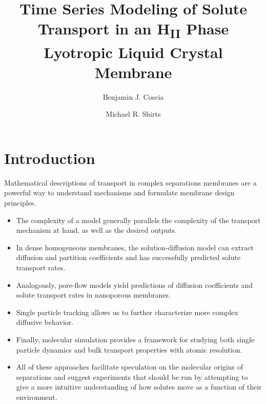 \documentclass{article}
\title{Time Series Modeling of Solute Transport in an H\textsubscript{II} Phase Lyotropic Liquid Crystal Membrane}
\author{Benjamin J. Coscia \and Michael R. Shirts}
\begin{document}
  \graphicspath{{./figures/}}
  \maketitle

  \section{Introduction}

  Mathematical descriptions of transport in complex separations membranes are a powerful 
  way to understand mechanisms and formulate membrane design principles.
  \begin{itemize}
    \item The complexity of a model generally parallels the complexity of the 
    transport mechanism at hand, as well as the desired outputs.
    \item In dense homogeneous membranes, the solution-diffusion model can extract
    diffusion and partition coefficients and has successfully predicted solute transport
    rates.
    \item Analogously, pore-flow models yield predictions of diffusion coefficients
    and solute transport rates in nanoporous membranes.~\cite{wijmans_solution-diffusion_1995}
    \item Single particle tracking allows us to further characterize more complex
    diffusive behavior.
    \item Finally, molecular simulation provides a framework for studying both single
    particle dynamics and bulk transport properties with atomic resolution.
    \item All of these approaches facilitate speculation on the molecular origins of
    separations and suggest experiments that should be run by attempting to give a more
    intuitive understanding of how solutes move as a function of their environment.
  \end{itemize}
\end{document}
